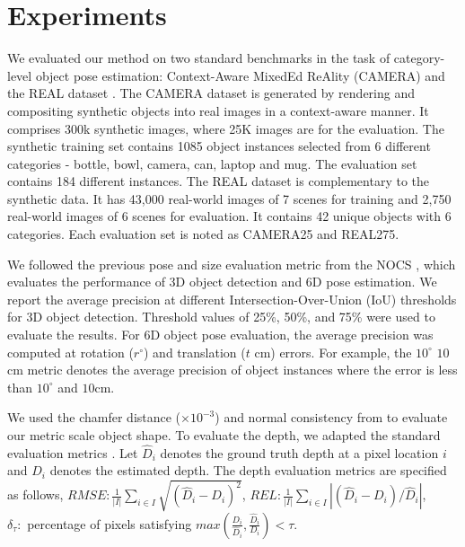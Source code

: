 \documentclass[letterpaper, 10 pt, journal, twoside]{IEEEtran}
\begin{document}
\section{Experiments}
We evaluated our method on two standard benchmarks in the task of category-level object pose estimation: Context-Aware MixedEd ReAlity (CAMERA) and the REAL dataset \cite{wang2019normalized}.
The CAMERA dataset is generated by rendering and compositing synthetic objects into real images in a context-aware manner. 
It comprises 300k synthetic images, where 25K images are for the evaluation. 
The synthetic training set contains 1085 object instances selected from 6 different categories - bottle, bowl, camera, can, laptop and mug. 
The evaluation set contains 184 different instances. 
The REAL \cite{wang2019normalized} dataset is complementary to the synthetic data. 
It has 43,000 real-world images of 7 scenes for training and 2,750 real-world images of 6 scenes for evaluation. 
It contains 42 unique objects with 6 categories. %
Each evaluation set is noted as CAMERA25 and REAL275.

We followed the previous pose and size evaluation metric from the NOCS \cite{wang2019normalized}, which evaluates the performance of 3D object detection and 6D pose estimation.
We report the average precision at different Intersection-Over-Union (IoU) thresholds for 3D object detection.
Threshold values of 25\%, 50\%, and 75\% were used to evaluate the results.
For 6D object pose evaluation, the average precision was computed at rotation ($r^{\circ}$) and translation ($t$ cm) errors.
For example, the $10^{\circ}$ $10$cm metric denotes the average precision of object instances where the error is less than $10^{\circ}$ and $10$cm.

We used the chamfer distance ($\times 10^{-3}$) and normal consistency from \cite{gkioxari2019mesh} to evaluate our metric scale object shape.
To evaluate the depth, we adapted the standard evaluation metrics \cite{silberman2012indoor}. 
Let $\hat{D}_i$ denotes the ground truth depth at a pixel location $i$ and $D_i$ denotes the estimated depth.
The depth evaluation metrics are specified as follows,  $RMSE: \frac{1}{\left | I  \right |} \sum_{i \in {I}} \sqrt{(\hat{D}_i-D_i)^2}$, $REL: \frac{1}{\left | I  \right |} \sum_{i \in {I}} \left | (\hat{D}_i-D_i) / \hat{D}_i \right |$, \\$\delta_{\tau}:$  percentage of pixels satisfying $max (\frac{D_i}{\hat{D}_i},\frac{\hat{D}_i}{D_i}) < \tau$.
\end{document}
